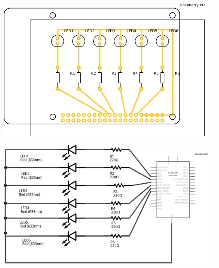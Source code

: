 \documentclass{article}
\begin{document}
\begin{figure}[H]
\centering
\includegraphics[height=0.4\textheight]{placafinal_pcb}
\end{figure}

\begin{figure}[H]
\centering
\includegraphics[height=0.4\textheight]{placafinalschematic_schem}
\end{figure}


\end{document}
